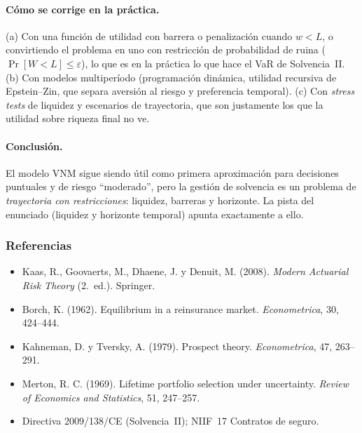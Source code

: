 \documentclass[a4paper,12pt]{article}
\begin{document}
\paragraph{C\'omo se corrige en la pr\'actica.} (a) Con una funci\'on de utilidad con barrera o penalizaci\'on cuando $w<L$, o convirtiendo el problema en uno con restricci\'on de probabilidad de ruina ($\Pr[W<L]\le\varepsilon$), lo que es en la pr\'actica lo que hace el VaR de Solvencia~II. (b) Con modelos multiper\'iodo (programaci\'on din\'amica, utilidad recursiva de Epstein--Zin, que separa aversi\'on al riesgo y preferencia temporal). (c) Con \emph{stress tests} de liquidez y escenarios de trayectoria, que son justamente los que la utilidad sobre riqueza final no ve.

\paragraph{Conclusi\'on.} El modelo VNM sigue siendo \'util como primera aproximaci\'on para decisiones puntuales y de riesgo ``moderado'', pero la gesti\'on de solvencia es un problema de \emph{trayectoria con restricciones}: liquidez, barreras y horizonte. La pista del enunciado (liquidez y horizonte temporal) apunta exactamente a ello.

\subsubsection*{Referencias}
\begin{itemize}[leftmargin=*,itemsep=0pt]
\item Kaas, R., Goovaerts, M., Dhaene, J. y Denuit, M. (2008). \emph{Modern Actuarial Risk Theory} (2.\textordfeminine\ ed.). Springer.
\item Borch, K. (1962). Equilibrium in a reinsurance market. \emph{Econometrica}, 30, 424--444.
\item Kahneman, D. y Tversky, A. (1979). Prospect theory. \emph{Econometrica}, 47, 263--291.
\item Merton, R. C. (1969). Lifetime portfolio selection under uncertainty. \emph{Review of Economics and Statistics}, 51, 247--257.
\item Directiva 2009/138/CE (Solvencia~II); NIIF~17 Contratos de seguro.
\end{itemize}
\end{document}
